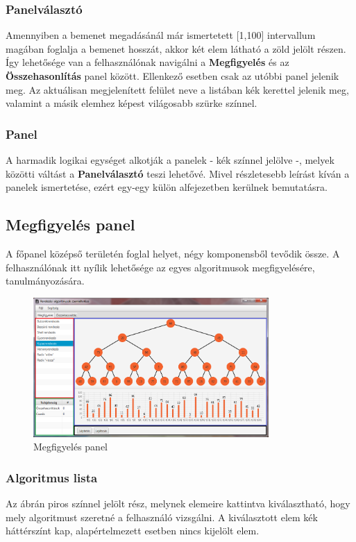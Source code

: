 \documentclass{elteikthesis}
\begin{document}
\subsubsection{Panelválasztó}
Amennyiben a bemenet megadásánál már ismertetett [1,100] intervallum magában foglalja a bemenet hosszát, akkor két elem látható a zöld jelölt részen. Így lehetősége van a felhasználónak navigálni a \textbf{Megfigyelés} és az \textbf{Összehasonlítás} panel között. Ellenkező esetben csak az utóbbi panel jelenik meg. Az aktuálisan megjelenített felület neve a listában kék kerettel jelenik meg, valamint a másik elemhez képest világosabb szürke színnel.
\subsubsection{Panel}
A harmadik logikai egységet alkotják a panelek - kék színnel jelölve -, melyek közötti váltást a \textbf{Panelválasztó} teszi lehetővé. Mivel részletesebb leírást kíván a panelek ismertetése, ezért egy-egy külön alfejezetben kerülnek bemutatásra.

\subsection{Megfigyelés panel}
A főpanel középső területén foglal helyet, négy komponensből tevődik össze. A felhasználónak itt nyílik lehetősége az egyes algoritmusok megfigyelésére, tanulmányozására.
 \begin{figure}[H]
 	\centering
 	\includegraphics[width=0.8\textwidth]{pics/watchpanel.png}
 	\caption{Megfigyelés panel}
 \end{figure}
\subsubsection{Algoritmus lista}
Az ábrán piros színnel jelölt rész, melynek elemeire kattintva kiválasztható, hogy mely algoritmust szeretné a felhasználó vizsgálni. A kiválasztott elem kék háttérszínt kap, alapértelmezett esetben nincs kijelölt elem.
\end{document}
